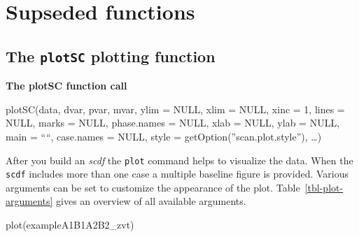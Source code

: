 \documentclass[
  letterpaper,
  DIV=11,
  numbers=noendperiod]{scrreprt}
\newenvironment{Shaded}{\begin{snugshade}}{\end{snugshade}}
\newcommand{\FunctionTok}[1]{\textcolor[rgb]{0.28,0.35,0.67}{#1}}
\newcommand{\NormalTok}[1]{\textcolor[rgb]{0.00,0.23,0.31}{#1}}
\begin{document}
\hypertarget{supseded-functions}{%
\chapter{Supseded functions}\label{supseded-functions}}

\hypertarget{sec-plotsc}{%
\section{\texorpdfstring{The \texttt{plotSC} plotting
function}{The plotSC plotting function}}\label{sec-plotsc}}

\begin{tcolorbox}[enhanced jigsaw, breakable, rightrule=.15mm, bottomrule=.15mm, arc=.35mm, colback=white, colframe=quarto-callout-tip-color-frame, opacityback=0, leftrule=.75mm, toprule=.15mm, left=2mm]
\begin{minipage}[t]{5.5mm}
\textcolor{quarto-callout-tip-color}{\faLightbulb}
\end{minipage}%
\begin{minipage}[t]{\textwidth - 5.5mm}

\textbf{The plotSC function call}\vspace{2mm}

plotSC(data, dvar, pvar, mvar, ylim = NULL, xlim = NULL, xinc = 1, lines
= NULL, marks = NULL, phase.names = NULL, xlab = NULL, ylab = NULL, main
= ````, case.names = NULL, style = getOption(''scan.plot.style''),
\ldots)

\end{minipage}%
\end{tcolorbox}

After you build an \emph{scdf} the \texttt{plot} command helps to
visualize the data. When the \texttt{scdf} includes more than one case a
multiple baseline figure is provided. Various arguments can be set to
customize the appearance of the plot. Table~\ref{tbl-plot-arguments}
gives an overview of all available arguments.

\begin{Shaded}
\begin{Highlighting}[]
\FunctionTok{plot}\NormalTok{(exampleA1B1A2B2\_zvt)}
\end{Highlighting}
\end{Shaded}
\end{document}
